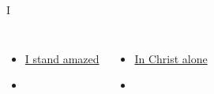 \documentclass[aspectratio=169]{beamer}
\begin{document}
\begin{frame}[t]{I}
\begin{columns}[t]
\begin{itemize}
    \item \hyperlink{I stand amazed['How marvelous']}{I stand amazed}
    \item[] \phantom{1}
\end{itemize}
\begin{itemize}
    \item \hyperlink{In Christ alone[]}{In Christ alone}
    \item[] \phantom{1}
\end{itemize}
\end{columns}
\end{frame}
\end{document}
